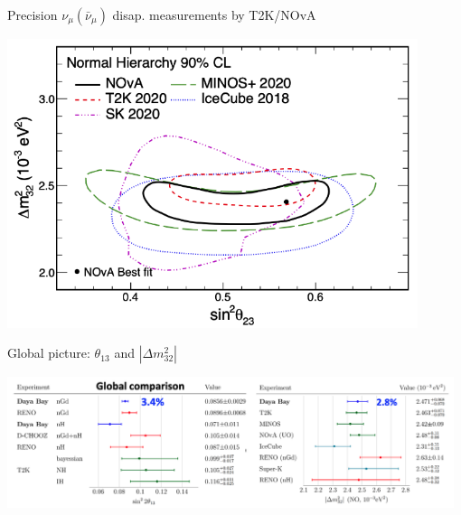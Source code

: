 \begin{frame}{Precision $\nu_{\mu}(\bar{\nu}_{\mu})$ disap. measurements by T2K/NOvA}

\begin{center}
  \includegraphics[width=0.90\textwidth]{./images/3nu/accelerator/acc_lbl_disapp_limits}
\end{center}

\end{frame}

%
%
%

\begin{frame}{Global picture: $\theta_{13}$ and $|\Delta m^{2}_{32}|$}

\begin{center}
\includegraphics[width=0.98\textwidth]{./images/3nu/reactor/global_theta13_and_dmsq32}
\end{center}

\end{frame}

%
%
%

